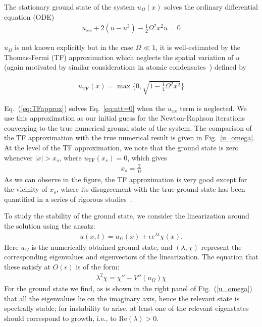 \documentclass[vecphys]{svmult}		%
\begin{document}
The stationary ground state of the system $u_{\Omega}(x)$ solves the
ordinary differential equation (ODE)
\begin{align}
u_{xx} + 2(u-u^3) - \frac{1}{2}\Omega^2 x^2 u = 0
\label{eq:utt=0}
\end{align} 

$u_{\Omega}$ is not known explicitly but in the case $\Omega \ll 1$, it is well-estimated by the Thomas-Fermi (TF) approximation which neglects
the spatial variation of $u$ (again
motivated by similar considerations in atomic
condensates~\cite{pethick,stringari}) defined by

\begin{align}
u_{\text{TF}}(x) = \max\bigg\{0, \sqrt{1-\frac{1}{4}\Omega^2 x^2} \bigg\}
\label{eq:TFapprox}
\end{align} 

Eq.~(\ref{eq:TFapprox}) solves Eq.~\eqref{eq:utt=0} when the $u_{xx}$ term is neglected. We use this approximation as our initial guess for the Newton-Raphson
iterations converging to the true numerical ground state of the system.
The comparison of the TF approximation with the true numerical result is
given in Fig.~\ref{u_omega}.
At the level of the TF approximation, we note that the ground state is zero whenever $|x|>x_s$, where $u_{\text{TF}}(x_s)=0$, which gives
\begin{align}
x_s = \frac{2}{\Omega}
\label{eq:x_supp}
\end{align}
As we can observe in the figure, the TF approximation is very good
except for the vicinity of $x_s$, where its disagreement with the
true ground state has been quantified in a series of rigorous
studies~\cite{gallo,karali}.

To study the stability of the ground state, we consider the linearization around
the solution using the ansatz:
\begin{align}
u(x,t) = u_{\Omega}(x) + \epsilon e^{\lambda t} \chi(x).
\label{ansatz_par}
\end{align}
Here $u_{\Omega}$ is the numerically obtained ground state, and $(\lambda,\chi)$
represent
the corresponding eigenvalues and eigenvectors of the linearization.
The equation that these satisfy at $O(\epsilon)$ is of the form:
\begin{align}
\lambda^2 \chi = \chi'' -V''(u_{\Omega})\chi \label{eq:lin}
\end{align}
For the ground state we find, as is shown in the right panel of Fig.~(\ref{u_omega})
that all the eigenvalues lie on the imaginary axis, hence the relevant
state is spectrally stable; for instability to arise, at least one
of the relevant eigenstates should correspond to growth, i.e.,
to Re$(\lambda)>0$.
\end{document}
